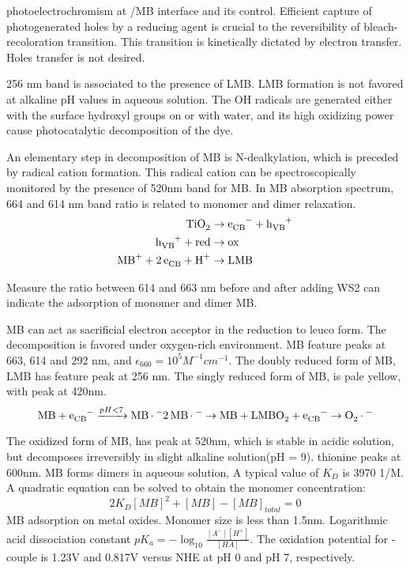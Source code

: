photoelectrochromism at /MB interface and its control. Efficient capture of photogenerated holes by a reducing agent is crucial to the reversibility of bleach-recoloration transition. This transition is kinetically dictated by electron transfer. Holes transfer is not desired.\cite{DeTacconi1997}

256 nm band is associated to the presence of LMB. LMB formation is not favored at alkaline pH values in aqueous solution. The OH radicals are generated either with the surface hydroxyl groups on  or with water, and its high oxidizing power cause photocatalytic decomposition of the dye.

An elementary step in decomposition of MB is N-dealkylation, which is preceded by radical cation formation.\cite{Takizawa1978} This radical cation can be spectroscopically monitored by the presence of 520nm band for MB. In MB absorption spectrum, 664 and 614 nm band ratio is related to monomer and dimer relaxation.
\begin{align}
\cee{TiO2 &\rightarrow e_{CB}^- + h_{VB}^+ \\
h_{VB}^+ + red &\rightarrow ox\\
MB^+ + 2e_{CB}^ + H^+ &\rightarrow LMB}
\end{align}

Measure the ratio between 614 and 663 nm before and after adding WS2 can indicate the adsorption of monomer and dimer MB.

MB can act as sacrificial electron acceptor in the reduction to leuco form. The decomposition is favored under oxygen-rich environment. MB feature peaks at 663, 614 and 292 nm, and $\epsilon_{660}=10^5 M^{-1}cm^{-1}$. The doubly reduced form of MB, LMB has feature peak at 256 nm. The singly reduced form of MB,  is pale yellow, with peak at 420nm.\cite{Mills1999}
\[
\cee{MB + e_{CB}^- ->[pH<7] MB.^-}
\cee{2MB.^- \rightarrow MB + LMB}
\cee{O2 + e_{CB}^- \rightarrow O2.^-}
\]

The oxidized form of MB,  has peak at 520nm, which is stable in acidic solution, but decomposes irreversibly in slight alkaline solution(pH = 9).
thionine peaks at 600nm.
MB forms dimers in aqueous solution,
A typical value of $K_D$ is 3970 1/M. A quadratic equation can be solved to obtain the monomer concentration:
\[
2K_D [MB]^2 + [MB] - [MB]_{total} = 0
\]
MB adsorption on metal oxides. Monomer size is less than 1.5nm.
Logarithmic acid dissociation constant $pK_a= -\log_10 \frac{[A^-][H^+]}{[HA]}$. The oxidation potential for - couple is 1.23V and 0.817V versus NHE at pH 0 and pH 7, respectively.

